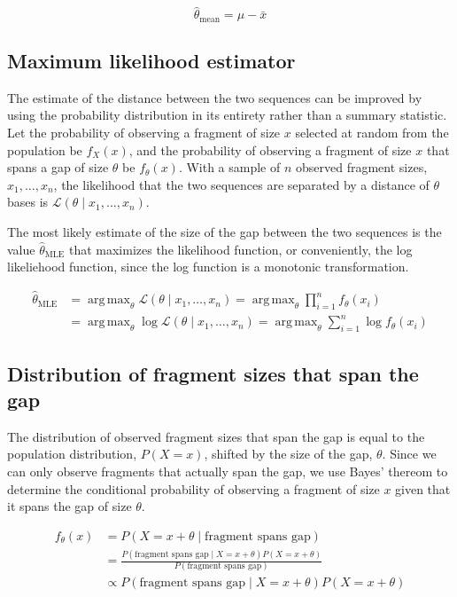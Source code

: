 \documentclass[letterpaper,12pt]{article}
\DeclareMathOperator*{\argmax}{arg\,max}
\DeclareMathOperator{\MLE}{MLE}
\begin{document}
\begin{equation*}
\hat \theta_\text{mean} = \mu - \bar x
\end{equation*}

\subsection*{Maximum likelihood estimator}

The estimate of the distance between the two sequences can be improved
by using the probability distribution in its entirety rather than a
summary statistic. Let the probability of observing a fragment of size
$x$ selected at random from the population be $f_X(x)$, and the
probability of observing a fragment of size $x$ that spans a gap of
size $\theta$ be $f_\theta(x)$. With a sample of $n$ observed fragment
sizes, $x_1, \dotsc , x_n$, the likelihood that the two sequences are
separated by a distance of $\theta$ bases is $\mathcal{L}(\theta \mid
x_1, \dotsc , x_n)$.

The most likely estimate of the size of the gap between the two
sequences is the value $\hat \theta_{\MLE}$ that maximizes the
likelihood function, or conveniently, the log likeliehood function,
since the log function is a monotonic transformation.

\begin{align*}
\hat \theta_{\MLE}
&= \argmax_\theta \mathcal{L}(\theta \mid x_1, \dotsc, x_n)
	= \argmax_\theta \prod_{i=1}^n f_\theta(x_i) \\
&= \argmax_\theta \log \mathcal{L}(\theta \mid x_1, \dotsc, x_n)
	= \argmax_\theta \sum_{i=1}^n \log f_\theta(x_i)
\end{align*}

\subsection*{Distribution of fragment sizes that span the gap}

The distribution of observed fragment sizes that span the gap is equal
to the population distribution, $P(X=x)$, shifted by the size of the
gap, $\theta$. Since we can only observe fragments that actually span
the gap, we use Bayes' thereom to determine the conditional
probability of observing a fragment of size $x$ given that it spans
the gap of size $\theta$.

\begin{align*}
f_{\theta}(x)
&= P(X=x+\theta \mid \text{fragment spans gap}) \\
&= \frac{ P(\text{fragment spans gap} \mid X=x+\theta) P(X=x+\theta) }
{ P(\text{fragment spans gap}) } \\
&\propto P(\text{fragment spans gap} \mid X=x+\theta) P(X=x+\theta)
\end{align*}
\end{document}
